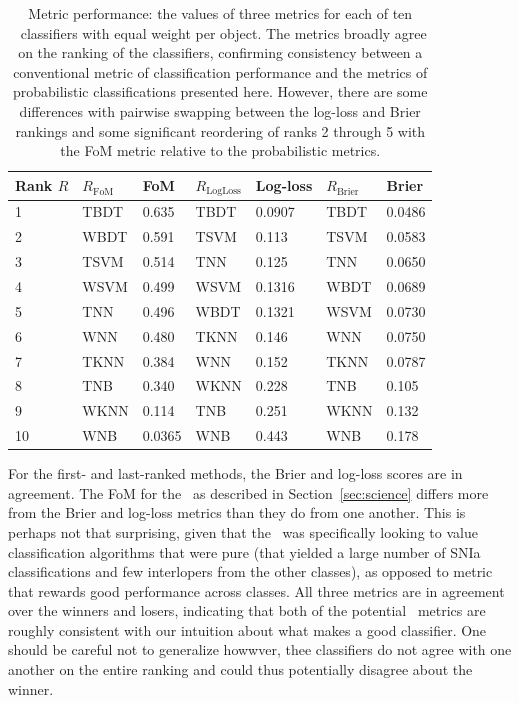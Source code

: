 \begin{table}[]
	\begin{centering}
\begin{tabular}{lllllll}%
Rank $R$ & $R_\mathrm{FoM}$ & FoM & %
$R_\mathrm{LogLoss}$ & Log-loss & $R_\mathrm{Brier}$ & Brier \\
\hline
1  & TBDT & 0.635  %
& TBDT & 0.0907 & TBDT & 0.0486 \\
2  & WBDT & 0.591  %
& TSVM & 0.113  & TSVM & 0.0583 \\
3  & TSVM & 0.514  %
& TNN  & 0.125  & TNN  & 0.0650 \\
4  & WSVM & 0.499  %
& WSVM & 0.1316 & WBDT & 0.0689 \\
5  & TNN  & 0.496  %
& WBDT & 0.1321 & WSVM & 0.0730 \\
6  & WNN  & 0.480  %
& TKNN & 0.146  & WNN  & 0.0750 \\
7  & TKNN & 0.384  %
& WNN  & 0.152  & TKNN & 0.0787 \\
8  & TNB  & 0.340  %
& WKNN & 0.228  & TNB  & 0.105  \\
9  & WKNN & 0.114  %
& TNB  & 0.251  & WKNN & 0.132  \\
10 & WNB  & 0.0365 %
& WNB  & 0.443  & WNB  & 0.178  \\
\end{tabular}
	\caption{Metric performance: the values of three metrics for each of ten \snmachine\ classifiers with equal weight per object.
	The metrics broadly agree on the ranking of the classifiers, confirming consistency between a conventional metric of classification performance and the metrics of probabilistic classifications presented here.
	However, there are some differences with pairwise swapping between the log-loss and Brier rankings and some significant reordering of ranks 2 through 5 with the FoM metric relative to the probabilistic metrics.}
	\label{tab:snmachineresults}
	\end{centering}
\end{table}

For the first- and last-ranked methods, the Brier and log-loss scores are in agreement. 
The FoM for the \snphotcc\, as described in Section~\ref{sec:science} differs more from the Brier and log-loss metrics than they do from one another. This is perhaps not that surprising, given that the \snphotcc\ was specifically looking to value classification algorithms that were pure (that yielded a large number of SNIa classifications and few interlopers from the other classes), as opposed to metric that rewards good performance across classes. All three metrics are in agreement over the winners and losers, indicating that both of the potential \plasticc\ metrics are roughly consistent with our intuition about what makes a good classifier. One should be careful not to generalize howwver, thee classifiers do not agree with one another on the entire ranking and could thus potentially disagree about the winner.

